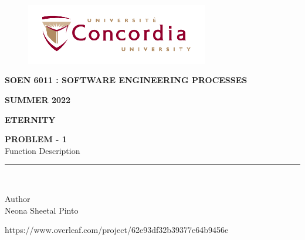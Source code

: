 \documentclass[letterpaper, 11pt]{article}
\begin{document}
\begin{titlepage}
\vspace*{0.7in}
\begin{center}
\begin{figure}[htb]
\begin{center}
\includegraphics[width=8cm]{univ_logo}
\end{center}
\end{figure}
\vspace*{0.3in}
\begin{Large}
\textbf{SOEN 6011 : SOFTWARE ENGINEERING PROCESSES} \\
\end{Large}
\vspace*{0.1in}
\begin{Large}
\textbf{SUMMER 2022} \\
\end{Large}
\vspace*{0.9in}
\begin{Large}
\textbf{ETERNITY} \\
\end{Large}
\vspace*{0.625in}
\begin{Large} 


\textbf{PROBLEM - 1} \\
\vspace*{0.2in}
Function Description\\
\vspace*{0.1in}
\end{Large}
\vspace*{0.625in}
\rule{80mm}{0.1mm}\\
\vspace*{0.1in}
\begin{large}
Author \\
\vspace*{0.1in}
Neona Sheetal Pinto\\
\vspace*{1.0in}
\date{\normalsize\today} 
\end{large}
\end{center}
\begin{center}
https://www.overleaf.com/project/62e93df32b39377e64b9456e\end{center}
\end{titlepage}
\end{document}
